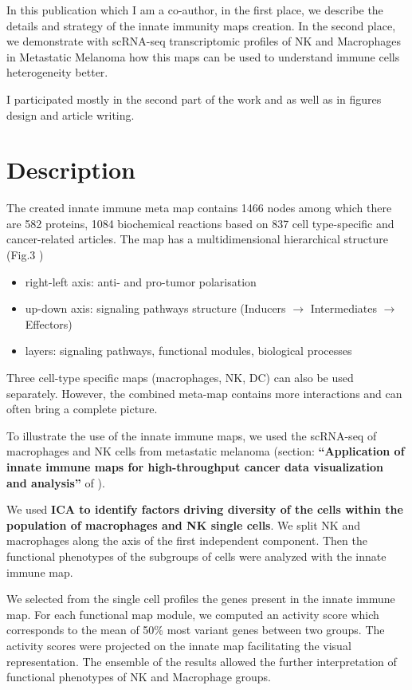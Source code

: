 \documentclass[12pt,]{book}
\providecommand{\tightlist}{%
  \setlength{\itemsep}{0pt}\setlength{\parskip}{0pt}}
\theoremstyle{definition}
\theoremstyle{definition}
\theoremstyle{definition}
\theoremstyle{remark}
\begin{document}
In this publication which I am a co-author, in the first place, we
describe the details and strategy of the innate immunity maps creation.
In the second place, we demonstrate with scRNA-seq transcriptomic
profiles of NK and Macrophages in Metastatic Melanoma how this maps can
be used to understand immune cells heterogeneity better.

I participated mostly in the second part of the work and as well as in
figures design and article writing.

\hypertarget{description-2}{%
\section{Description}\label{description-2}}

The created innate immune meta map contains 1466 nodes among which there
are 582 proteins, 1084 biochemical reactions based on 837 cell
type-specific and cancer-related articles. The map has a
multidimensional hierarchical structure (Fig.3 \citet{Kondratova2018})

\begin{itemize}
\tightlist
\item
  right-left axis: anti- and pro-tumor polarisation
\item
  up-down axis: signaling pathways structure (Inducers \(\rightarrow\)
  Intermediates \(\rightarrow\) Effectors)
\item
  layers: signaling pathways, functional modules, biological processes
\end{itemize}

Three cell-type specific maps (macrophages, NK, DC) can also be used
separately. However, the combined meta-map contains more interactions
and can often bring a complete picture.

To illustrate the use of the innate immune maps, we used the scRNA-seq
of macrophages and NK cells from metastatic melanoma (section:
\textbf{``Application of innate immune maps for high-throughput cancer
data visualization and analysis''} of \citet{Kondratova2018}).

We used \textbf{ICA to identify factors driving diversity of the cells
within the population of macrophages and NK single cells}. We split NK
and macrophages along the axis of the first independent component. Then
the functional phenotypes of the subgroups of cells were analyzed with
the innate immune map.

We selected from the single cell profiles the genes present in the
innate immune map. For each functional map module, we computed an
activity score which corresponds to the mean of 50\% most variant genes
between two groups. The activity scores were projected on the innate map
facilitating the visual representation. The ensemble of the results
allowed the further interpretation of functional phenotypes of NK and
Macrophage groups.
\end{document}
